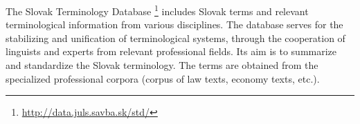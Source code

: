 The Slovak Terminology Database
\footnote{\url{http://data.juls.savba.sk/std/}} includes Slovak terms
and relevant terminological information from various disciplines. The
database serves for the stabilizing and unification of terminological
systems, through the cooperation of linguists and experts from relevant
professional fields. Its aim is to summarize and standardize the Slovak 
terminology. The terms are obtained from the specialized professional
corpora (corpus of law texts, economy texts, etc.).

